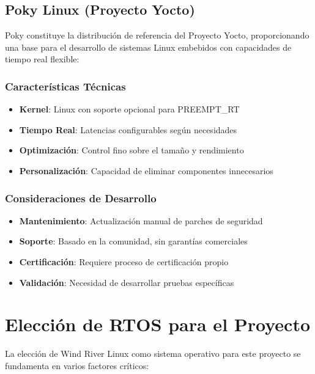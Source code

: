     \subsection{Poky Linux (Proyecto Yocto)}
        Poky constituye la distribución de referencia del Proyecto Yocto, proporcionando una base para el desarrollo de sistemas Linux embebidos con capacidades de tiempo real flexible:

        \subsubsection{Características Técnicas}
            \begin{itemize}
                \item \textbf{Kernel}: Linux con soporte opcional para PREEMPT\_RT
                \item \textbf{Tiempo Real}: Latencias configurables según necesidades
                \item \textbf{Optimización}: Control fino sobre el tamaño y rendimiento
                \item \textbf{Personalización}: Capacidad de eliminar componentes innecesarios
            \end{itemize}

        \subsubsection{Consideraciones de Desarrollo}
            \begin{itemize}
                \item \textbf{Mantenimiento}: Actualización manual de parches de seguridad
                \item \textbf{Soporte}: Basado en la comunidad, sin garantías comerciales
                \item \textbf{Certificación}: Requiere proceso de certificación propio
                \item \textbf{Validación}: Necesidad de desarrollar pruebas específicas
            \end{itemize}

\newpage
\section{Elección de RTOS para el Proyecto}
    La elección de Wind River Linux como sistema operativo para este proyecto se fundamenta en varios factores críticos:

